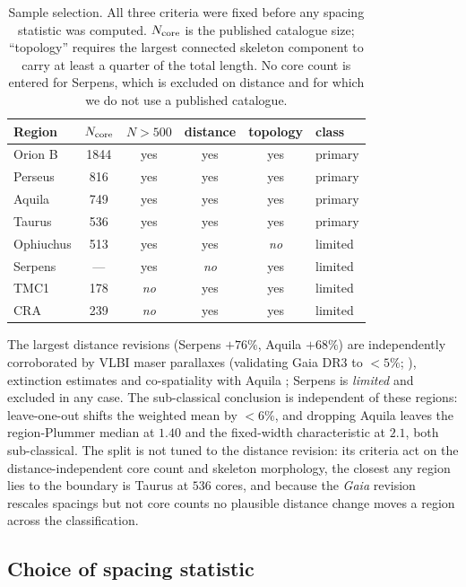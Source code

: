 \documentclass[usenatbib,twoside,twocolumn]{mnras}
\begin{document}
\begin{table}
\caption{Sample selection. All three criteria were fixed before any spacing statistic was computed. $N_{\rm core}$ is the published catalogue size; ``topology'' requires the largest connected skeleton component to carry at least a quarter of the total length. No core count is entered for Serpens, which is excluded on distance and for which we do not use a published catalogue.}
\label{tab:selection}
\footnotesize
\setlength{\tabcolsep}{4pt}
\begin{tabular}{lccccl}
\toprule
Region & $N_{\rm core}$ & $N>500$ & distance & topology & class \\
\midrule
Orion B   & 1844 & yes & yes & yes & primary \\
Perseus   & 816  & yes & yes & yes & primary \\
Aquila    & 749  & yes & yes & yes & primary \\
Taurus    & 536  & yes & yes & yes & primary \\
\midrule
Ophiuchus & 513  & yes & yes & \emph{no} & limited \\
Serpens   & ---  & yes & \emph{no} & yes & limited \\
TMC1      & 178  & \emph{no} & yes & yes & limited \\
CRA       & 239  & \emph{no} & yes & yes & limited \\
\bottomrule
\end{tabular}
\end{table} The largest distance revisions (Serpens $+76\%$, Aquila $+68\%$) are independently corroborated by VLBI maser parallaxes (validating Gaia DR3 to $<5\%$; \citealt{Kounkel2018,Xu2021,OrtizLeon2018,OrtizLeon2017}), extinction estimates \citep{Yan2022,Green2024} and co-spatiality with Aquila \citep{Zucker2020}; Serpens is \emph{limited} and excluded in any case. The sub-classical conclusion is independent of these regions: leave-one-out shifts the weighted mean by $<6\%$, and dropping Aquila leaves the region-Plummer median at $1.40$ and the fixed-width characteristic at $2.1$, both sub-classical. The split is not tuned to the distance revision: its criteria act on the distance-independent core count and skeleton morphology, the closest any region lies to the boundary is Taurus at $536$ cores, and because the \textit{Gaia} revision rescales spacings but not core counts no plausible distance change moves a region across the classification.

\subsection{Choice of spacing statistic}
\label{sec:statistics}
\end{document}
